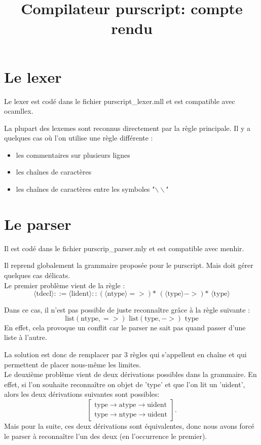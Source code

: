 \documentclass[12pt,a4paper,french]{article}
\title{Compilateur purscript: compte rendu}
\begin{document}
\maketitle

\part*{Le lexer}
Le lexer est codé dans le fichier purscript\_lexer.mll et est compatible avec ocamllex.

La plupart des lexemes sont reconnus directement par la règle principale. Il y a quelques cas où l'on utilise une règle différente :

\begin{itemize}
\item les commentaires sur plusieurs lignes
\item les chaînes de caractères
\item les chaînes de caractères entre les symboles "$\backslash\backslash$"
\end{itemize}


\part*{Le parser}
Il est codé dans le fichier purscrip\_parser.mly et est compatible avec menhir.

Il reprend globalement la grammaire proposée pour le purscript. Mais doit gérer quelques cas délicats. \\

Le premier problème vient de la règle :
\[ \langle\text{tdecl}\rangle ::= \langle \text{lident}\rangle :: (\langle\text{ntype}\rangle =>)\text{* } (\langle\text{type}\rangle ->)\text{* } \langle\text{type}\rangle \]

Dans ce cas, il n'est pas possible de juste reconnaître grâce à la règle suivante :
\[  \text{list}(\text{ntype}, =>) \text{ list}(\text{type}, ->) \text{ type} \]
En effet, cela provoque un conflit car le parser ne sait pas quand passer d'une liste à l'autre.

La solution est donc de remplacer par 3 règles qui s'appellent en chaîne et qui permettent de placer nous-même les limites.
\\
Le deuxième problème vient de deux dérivations possibles dans la grammaire. En effet, si l'on souhaite reconnaître on objet de 'type' et que l'on lit un 'uident', alors les deux dérivations suivantes sont possibles:
\[ \left[ \begin{array}{l}
	\text{type} \rightarrow \text{atype} \rightarrow \text{uident} \\
	\text{type} \rightarrow \text{ntype} \rightarrow \text{uident}
\end{array} \right].
\]
Mais pour la suite, ces deux dérivations sont équivalentes, donc nous avons forcé le parser à reconnaître l'un des deux (en l'occurrence le premier).
\end{document}
